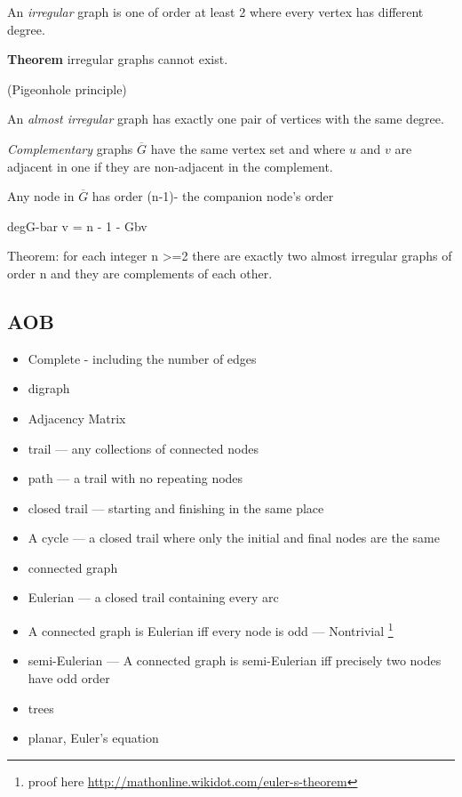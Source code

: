An \textit{irregular} graph is one of order at least 2 where every vertex has different degree. 

\textbf{Theorem} irregular graphs cannot exist. 

(Pigeonhole principle)

An \textit{almost irregular} graph has exactly one pair of vertices with the same degree. 

\textit{Complementary} graphs $\overline{G}$ have the same vertex set and where $u$ and $v$ are adjacent in one if they are non-adjacent in the complement. 

Any node in $\overline{G}$ has order (n-1)- the companion node’s order 

degG-bar v  = n - 1 - Gbv

Theorem: for each integer n >=2 there are exactly two almost irregular graphs of order n and they are complements of each other. 


\subsection{AOB}

\begin{itemize}
	\item Complete - including the number of edges
	\item digraph
	\item Adjacency Matrix
	\item trail --- any collections of connected nodes 
	\item path --- a trail with no repeating nodes 
	\item closed trail --- starting and finishing in the same place
	\item A cycle --- a closed trail where only the initial and final nodes are the same 
	\item connected graph 
	\item Eulerian --- a closed trail containing every arc 
	\item A connected graph is Eulerian iff every node is odd --- Nontrivial \footnote{proof here \url{http://mathonline.wikidot.com/euler-s-theorem}}
	\item semi-Eulerian --- A connected graph is semi-Eulerian iff precisely two nodes have odd order  
	\item trees
	\item planar, Euler's equation 
\end{itemize}
